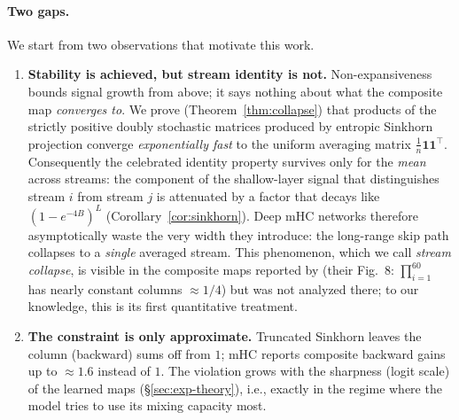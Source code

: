 \documentclass[11pt]{article}
\newcommand{\ones}{\mathbf{1}}
\newcommand{\J}{\tfrac{1}{n}\ones\ones^{\!\top}}
\begin{document}
\paragraph{Two gaps.} We start from two observations that motivate this work.
\begin{enumerate}
\item \textbf{Stability is achieved, but stream identity is not.} Non-expansiveness bounds signal growth from above; it says nothing about what the composite map \emph{converges to}. We prove (Theorem~\ref{thm:collapse}) that products of the strictly positive doubly stochastic matrices produced by entropic Sinkhorn projection converge \emph{exponentially fast} to the uniform averaging matrix $\J$. Consequently the celebrated identity property survives only for the \emph{mean} across streams: the component of the shallow-layer signal that distinguishes stream $i$ from stream $j$ is attenuated by a factor that decays like $(1-e^{-4B})^{L}$ (Corollary~\ref{cor:sinkhorn}). Deep mHC networks therefore asymptotically waste the very width they introduce: the long-range skip path collapses to a \emph{single} averaged stream. This phenomenon, which we call \emph{stream collapse}, is visible in the composite maps reported by \citet{xie2025mhc} (their Fig.~8: $\prod_{i=1}^{60}$ has nearly constant columns $\approx 1/4$) but was not analyzed there; to our knowledge, this is its first quantitative treatment.
\item \textbf{The constraint is only approximate.} Truncated Sinkhorn leaves the column (backward) sums off from $1$; mHC reports composite backward gains up to $\approx1.6$ instead of $1$. The violation grows with the sharpness (logit scale) of the learned maps (\S\ref{sec:exp-theory}), i.e., exactly in the regime where the model tries to use its mixing capacity most.
\end{enumerate}
\end{document}

